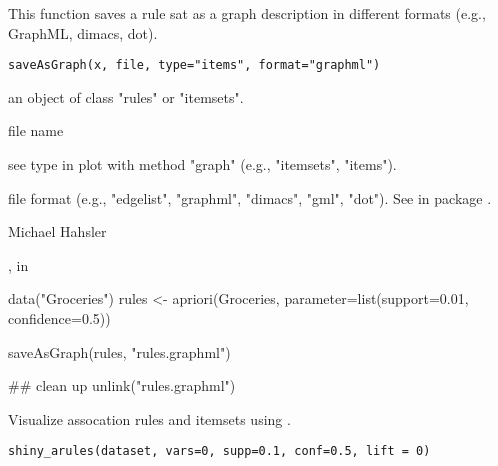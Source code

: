 \documentclass[letterpaper]{book}
\begin{document}
%
\begin{Description}\relax
This function 
saves a rule sat as a graph description in different formats 
(e.g., GraphML, dimacs, dot).
\end{Description}
%
\begin{Usage}
\begin{verbatim}
saveAsGraph(x, file, type="items", format="graphml")
\end{verbatim}
\end{Usage}
%
\begin{Arguments}
\begin{ldescription}
\item[\code{x}]  an object of class "rules" or "itemsets".
\item[\code{file}]  file name
\item[\code{type}]  see type in plot with method "graph" 
(e.g., "itemsets", "items").
\item[\code{format}]  file format (e.g., "edgelist", 
"graphml", "dimacs", "gml", "dot"). See  in package 
.
\end{ldescription}
\end{Arguments}
%
\begin{Author}\relax
Michael Hahsler
\end{Author}
%
\begin{SeeAlso}\relax
{},  in 
\end{SeeAlso}
%
\begin{Examples}
\begin{ExampleCode}
data("Groceries")
rules <- apriori(Groceries, parameter=list(support=0.01, confidence=0.5))

saveAsGraph(rules, "rules.graphml")

## clean up
unlink("rules.graphml")
\end{ExampleCode}
\end{Examples}
%
\begin{Description}\relax
Visualize assocation rules and itemsets using .
\end{Description}
%
\begin{Usage}
\begin{verbatim}
shiny_arules(dataset, vars=0, supp=0.1, conf=0.5, lift = 0)
\end{verbatim}
\end{Usage}
\end{document}
